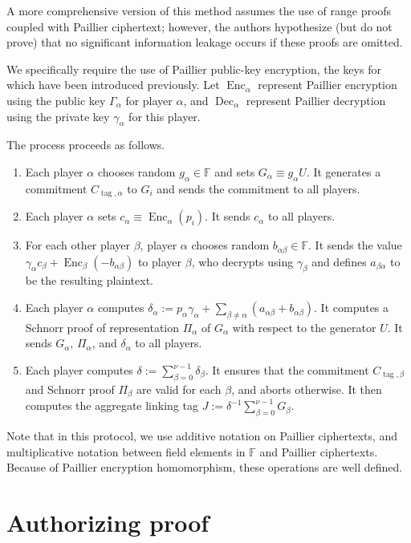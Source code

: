 \documentclass{article}
\newcommand{\F}{\mathbb{F}}
\newcommand{\enc}{\operatorname{Enc}}
\newcommand{\dec}{\operatorname{Dec}}
\begin{document}
A more comprehensive version of this method assumes the use of range proofs coupled with Paillier ciphertext; however, the authors hypothesize (but do not prove) that no significant information leakage occurs if these proofs are omitted.

We specifically require the use of Paillier public-key encryption, the keys for which have been introduced previously.
Let $\enc_\alpha$ represent Paillier encryption using the public key $\Gamma_\alpha$ for player $\alpha$, and $\dec_\alpha$ represent Paillier decryption using the private key $\gamma_\alpha$ for this player.

The process proceeds as follows.
\begin{enumerate}
    \item Each player $\alpha$ chooses random $g_\alpha \in \F$ and sets $G_\alpha \equiv g_\alpha U$.
    It generates a commitment $C_{\operatorname{tag},\alpha}$ to $G_i$ and sends the commitment to all players.
    \item Each player $\alpha$ sets $c_\alpha \equiv \enc_\alpha(p_i)$. It sends $c_\alpha$ to all players.
    \item For each other player $\beta$, player $\alpha$ chooses random $b_{\alpha\beta} \in \F$.
    It sends the value $\gamma_\alpha c_\beta + \enc_\beta(-b_{\alpha\beta})$ to player $\beta$, who decrypts using $\gamma_\beta$ and defines $a_{\beta\alpha}$ to be the resulting plaintext.
    \item Each player $\alpha$ computes $\delta_\alpha := p_\alpha \gamma_\alpha + \sum_{\beta \neq \alpha}(a_{\alpha\beta} + b_{\alpha\beta})$.
    It computes a Schnorr proof of representation $\Pi_\alpha$ of $G_\alpha$ with respect to the generator $U$.
    It sends $G_\alpha$, $\Pi_\alpha$, and $\delta_\alpha$ to all players.
    \item Each player computes $\delta := \sum_{\beta=0}^{\nu-1} \delta_\beta$.
    It ensures that the commitment $C_{\operatorname{tag},\beta}$ and Schnorr proof $\Pi_\beta$ are valid for each $\beta$, and aborts otherwise.
    It then computes the aggregate linking tag $J := \delta^{-1} \sum_{\beta=0}^{\nu-1} G_\beta$.
\end{enumerate}

Note that in this protocol, we use additive notation on Paillier ciphertexts, and multiplicative notation between field elements in $\F$ and Paillier ciphertexts.
Because of Paillier encryption homomorphism, these operations are well defined.


\section{Authorizing proof}
\end{document}
